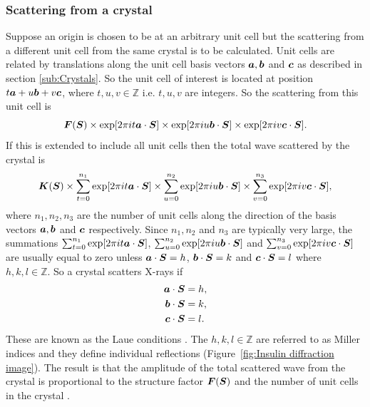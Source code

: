         \subsubsection{Scattering from a crystal}
        \label{subs:Scattering from a crystal}
            Suppose an origin is chosen to be at an arbitrary unit cell but the scattering from a different unit cell from the same crystal is to be calculated. Unit cells are related by translations along the unit cell basis vectors $\boldsymbol{a}, \boldsymbol{b}$ and  $\boldsymbol{c}$ as described in section \ref{sub:Crystals}. So the unit cell of interest is located at position $t\boldsymbol{a} + u\boldsymbol{b} + v\boldsymbol{c}$, where $t,u,v \in \mathbb{Z}$ i.e. $t,u,v$ are integers. So the scattering from this unit cell is
            \begin{equation}
                \boldsymbol{F}(\boldsymbol{S}) \times \exp[2\pi i t\boldsymbol{a} \cdot \boldsymbol{S}] \times \exp[2\pi i u\boldsymbol{b} \cdot \boldsymbol{S}] \times \exp[2\pi i v\boldsymbol{c} \cdot \boldsymbol{S}].
            \end{equation}
            If this is extended to include all unit cells then the total wave scattered by the crystal is
            \begin{equation}
                \boldsymbol{K}(\boldsymbol{S}) \times \sum_{t=0}^{n_1}\exp[2\pi i t\boldsymbol{a} \cdot \boldsymbol{S}] \times \sum_{u=0}^{n_2}\exp[2\pi i u\boldsymbol{b} \cdot \boldsymbol{S}] \times \sum_{v=0}^{n_3}\exp[2\pi i v\boldsymbol{c} \cdot \boldsymbol{S}],
            \end{equation}
            where $n_1, n_2, n_3$ are the number of unit cells along the direction of the basis vectors $\boldsymbol{a}, \boldsymbol{b}$ and $\boldsymbol{c}$ respectively.
            Since $n_1, n_2$ and $n_3$ are typically very large, the summations
            $\sum_{t=0}^{n_1}\exp[2\pi i t\boldsymbol{a} \cdot \boldsymbol{S}]$, $\sum_{u=0}^{n_2}\exp[2\pi i u\boldsymbol{b} \cdot \boldsymbol{S}]$ and $\sum_{v=0}^{n_3}\exp[2\pi i v\boldsymbol{c} \cdot \boldsymbol{S}]$
            are usually equal to zero unless $\boldsymbol{a} \cdot \boldsymbol{S} = h$, $\boldsymbol{b} \cdot \boldsymbol{S} = k$ and $\boldsymbol{c} \cdot \boldsymbol{S} = l$ where $h,k,l \in \mathbb{Z}$.
            So a crystal scatters X-rays if
            \begin{align}
                \boldsymbol{a} \cdot \boldsymbol{S} &= h, \\
                \boldsymbol{b} \cdot \boldsymbol{S} &= k, \\
                \boldsymbol{c} \cdot \boldsymbol{S} &= l.
                \label{eq:Laue conditions}
            \end{align}
            These are known as the Laue conditions \cite{drenth1999}. The $h,k,l \in \mathbb{Z}$ are referred to as Miller indices and they define individual reflections (Figure~\ref{fig:Insulin diffraction image}). The result is that the amplitude of the total scattered wave from the crystal is proportional to the structure factor $\boldsymbol{F}(\boldsymbol{S})$ and the number of unit cells in the crystal \cite{drenth1999}.

